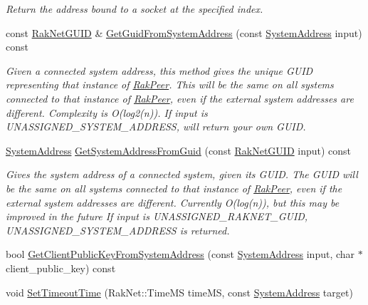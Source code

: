 \begin{DoxyCompactItemize}
\begin{DoxyCompactList}\small\item\em Return the address bound to a socket at the specified index. \end{DoxyCompactList}\item 
const \hyperlink{struct_rak_net_1_1_rak_net_g_u_i_d}{Rak\-Net\-G\-U\-I\-D} \& \hyperlink{class_rak_net_1_1_rak_peer_a41fcd1175cb8fee67b12835944ed51da}{Get\-Guid\-From\-System\-Address} (const \hyperlink{struct_rak_net_1_1_system_address}{System\-Address} input) const 
\begin{DoxyCompactList}\small\item\em Given a connected system address, this method gives the unique G\-U\-I\-D representing that instance of \hyperlink{class_rak_net_1_1_rak_peer}{Rak\-Peer}. This will be the same on all systems connected to that instance of \hyperlink{class_rak_net_1_1_rak_peer}{Rak\-Peer}, even if the external system addresses are different. Complexity is O(log2(n)). If {\itshape input} is U\-N\-A\-S\-S\-I\-G\-N\-E\-D\-\_\-\-S\-Y\-S\-T\-E\-M\-\_\-\-A\-D\-D\-R\-E\-S\-S, will return your own G\-U\-I\-D. \end{DoxyCompactList}\item 
\hyperlink{struct_rak_net_1_1_system_address}{System\-Address} \hyperlink{class_rak_net_1_1_rak_peer_ac591b0ac4b88b9cdf182fc4769d9de98}{Get\-System\-Address\-From\-Guid} (const \hyperlink{struct_rak_net_1_1_rak_net_g_u_i_d}{Rak\-Net\-G\-U\-I\-D} input) const 
\begin{DoxyCompactList}\small\item\em Gives the system address of a connected system, given its G\-U\-I\-D. The G\-U\-I\-D will be the same on all systems connected to that instance of \hyperlink{class_rak_net_1_1_rak_peer}{Rak\-Peer}, even if the external system addresses are different. Currently O(log(n)), but this may be improved in the future If {\itshape input} is U\-N\-A\-S\-S\-I\-G\-N\-E\-D\-\_\-\-R\-A\-K\-N\-E\-T\-\_\-\-G\-U\-I\-D, U\-N\-A\-S\-S\-I\-G\-N\-E\-D\-\_\-\-S\-Y\-S\-T\-E\-M\-\_\-\-A\-D\-D\-R\-E\-S\-S is returned. \end{DoxyCompactList}\item 
bool \hyperlink{class_rak_net_1_1_rak_peer_abc607f77d9724097030d2da6868074b3}{Get\-Client\-Public\-Key\-From\-System\-Address} (const \hyperlink{struct_rak_net_1_1_system_address}{System\-Address} input, char $\ast$client\-\_\-public\-\_\-key) const 
\item 
void \hyperlink{class_rak_net_1_1_rak_peer_a46305b16342c6f5ec1c1a66623032310}{Set\-Timeout\-Time} (Rak\-Net\-::\-Time\-M\-S time\-M\-S, const \hyperlink{struct_rak_net_1_1_system_address}{System\-Address} target)

\end{DoxyCompactItemize}
